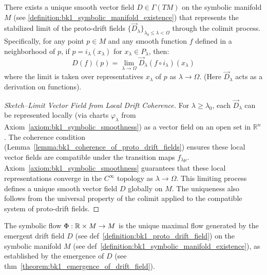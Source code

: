 \begin{theorem}
\label{theorem:bk1_emergence_of_drift_field}
There exists a unique smooth vector field $D \in \Gamma(TM)$ on the symbolic manifold $M$ (see \ref{definition:bk1_symbolic_manifold_existence}) that represents the stabilized limit of the proto-drift fields $\{\vec{D}_\lambda\}_{\lambda_0 \le \lambda < \Omega}$ through the colimit process. Specifically, for any point $p \in M$ and any smooth function $f$ defined in a neighborhood of $p$, if $p = i_\lambda(x_\lambda)$ for $x_\lambda \in P_\lambda$, then:
\[
D(f)(p) = \lim_{\lambda \to \Omega} \vec{D}_\lambda(f \circ i_\lambda)(x_\lambda)
\]
where the limit is taken over representatives $x_\lambda$ of $p$ as $\lambda \to \Omega$. (Here $\vec{D}_\lambda$ acts as a derivation on functions).

\begin{proof}[Sketch–Limit Vector Field from Local Drift Coherence]
\label{proof:bk1_sketch_drift_limit_vector_field}
For $\lambda \ge \lambda_0$, each $\vec{D}_\lambda$ can be represented locally (via charts $\varphi_\lambda$ from Axiom~\ref{axiom:bk1_symbolic_smoothness}) as a vector field on an open set in $\mathbb{R}^n$. The coherence condition (Lemma~\ref{lemma:bk1_coherence_of_proto_drift_fields}) ensures these local vector fields are compatible under the transition maps $f_{\lambda\mu}$. Axiom~\ref{axiom:bk1_symbolic_smoothness} guarantees that these local representations converge in the $C^\infty$ topology as $\lambda \to \Omega$. This limiting process defines a unique smooth vector field $D$ globally on $M$. The uniqueness also follows from the universal property of the colimit applied to the compatible system of proto-drift fields.
\end{proof}
\end{theorem}

\begin{definition}
\label{definition:bk1_symbolic_flow}
The symbolic flow $\Phi: \mathbb{R} \times M \to M$ is the unique maximal flow generated by the emergent drift field $D$ (see def~\ref{definition:bk1_proto_drift_field}) on the symbolic manifold $M$ (see def~\ref{definition:bk1_symbolic_manifold_existence}), as established by the emergence of $D$ (see thm~\ref{theorem:bk1_emergence_of_drift_field}).
\end{definition}

